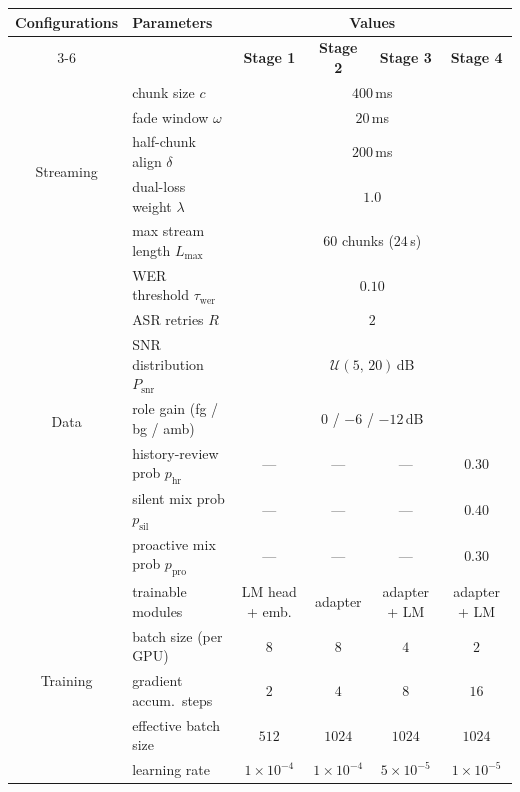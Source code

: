 \documentclass{llmxive}
\providecommand{\arraystretch}{1.0}
\begin{document}
\begin{table}[!htbp]
\centering
\footnotesize
\setlength{\tabcolsep}{4pt}
\renewcommand{\arraystretch}{1.05}
\begin{tabular}{c|l|cccc}
\toprule
\textbf{Configurations} & \textbf{Parameters} & \multicolumn{4}{c}{\textbf{Values}} \\
\cmidrule(lr){3-6}
 &  & \textbf{Stage 1} & \textbf{Stage 2} & \textbf{Stage 3} & \textbf{Stage 4} \\
\midrule
\multirow{5}{*}{Streaming}
  & chunk size $c$                   & \multicolumn{4}{c}{$400$\,ms} \\
  & fade window $\omega$             & \multicolumn{4}{c}{$20$\,ms} \\
  & half-chunk align $\delta$        & \multicolumn{4}{c}{$200$\,ms} \\
  & dual-loss weight $\lambda$       & \multicolumn{4}{c}{$1.0$} \\
  & max stream length $L_{\max}$     & \multicolumn{4}{c}{$60$ chunks ($24$\,s)} \\
\midrule
\multirow{7}{*}{Data}
  & WER threshold $\tau_{\text{wer}}$ & \multicolumn{4}{c}{$0.10$} \\
  & ASR retries $R$                  & \multicolumn{4}{c}{$2$} \\
  & SNR distribution $P_{\text{snr}}$ & \multicolumn{4}{c}{$\mathcal{U}(5,\,20)$\,dB} \\
  & role gain (fg / bg / amb)        & \multicolumn{4}{c}{$0$ / $-6$ / $-12$\,dB} \\
  & history-review prob $p_{\text{hr}}$  & --- & --- & --- & $0.30$ \\
  & silent mix prob $p_{\text{sil}}$     & --- & --- & --- & $0.40$ \\
  & proactive mix prob $p_{\text{pro}}$  & --- & --- & --- & $0.30$ \\
\midrule
\multirow{11}{*}{Training}
  & trainable modules         & LM head + emb.       & adapter              & adapter + LM         & adapter + LM \\
  & batch size (per GPU)      & $8$                  & $8$                  & $4$                  & $2$ \\
  & gradient accum.\ steps    & $2$                  & $4$                  & $8$                  & $16$ \\
  & effective batch size      & $512$                & $1024$               & $1024$               & $1024$ \\
  & learning rate             & $1\!\times\!10^{-4}$ & $1\!\times\!10^{-4}$ & $5\!\times\!10^{-5}$ & $1\!\times\!10^{-5}$ \\

\end{tabular}
\end{table}
\end{document}
